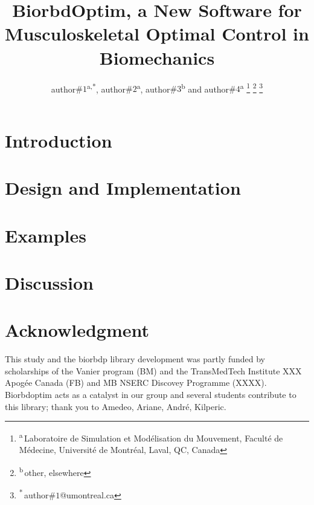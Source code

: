 \documentclass[letterpaper, 10 pt, conference]{ieeeconf}  %
\title{\LARGE \bf BiorbdOptim, a New Software for Musculoskeletal Optimal Control in Biomechanics}
\author{author$\#1$\textsuperscript{a,*}, author$\#2$\textsuperscript{a}, author$\#3$\textsuperscript{b}  and  author$\#4$\textsuperscript{a}%
\thanks{\textsuperscript{a}\,Laboratoire de Simulation et Modélisation du Mouvement, Faculté de Médecine, Université de Montréal, Laval, QC, Canada}%
\thanks{\textsuperscript{b}\,other, elsewhere}%
\thanks{\textsuperscript{*}\,author$\#1$@umontreal.ca}
}
\begin{document}
\maketitle
\thispagestyle{plain}
\pagestyle{plain}



\section{Introduction}\label{sec:introduction}


\section{Design and Implementation}\label{sec:design&impl}


\section{Examples}\label{sec:Examples}


\section{Discussion}\label{sec:discussion}


\section*{Acknowledgment}
This study and the biorbdp library development was partly funded by scholarships of the  Vanier program (BM) and the TransMedTech Institute XXX Apogée Canada (FB) and MB NSERC Discovey Programme (XXXX). Biorbdoptim acts as a catalyst in our group and several students contribute to this library; thank you to Amedeo, Ariane, André, Kilperic. 








\newpage
\label{sec:appendix}
\end{document}
